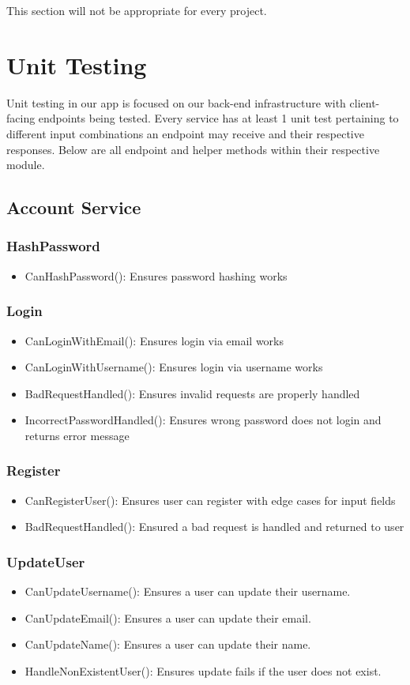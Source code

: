 \documentclass[12pt, titlepage]{article}
\begin{document}
This section will not be appropriate for every project.

\section{Unit Testing}

Unit testing in our app is focused on our back-end infrastructure with client-facing endpoints being tested. Every service has at least 1 unit test pertaining to different input combinations an endpoint may receive and their respective responses. Below are all endpoint and helper methods within their respective module.

\subsection{Account Service}
\subsubsection{HashPassword}
\begin{itemize}
     \item CanHashPassword(): Ensures password hashing works
\end{itemize}
\subsubsection{Login}
\begin{itemize}
    \item CanLoginWithEmail(): Ensures login via email works
    \item CanLoginWithUsername(): Ensures login via username works
    \item BadRequestHandled(): Ensures invalid requests are properly handled
    \item IncorrectPasswordHandled(): Ensures wrong password does not login and returns error message
\end{itemize}
\subsubsection{Register}
\begin{itemize}
    \item CanRegisterUser(): Ensures user can register with edge cases for input fields
    \item BadRequestHandled(): Ensured a bad request is handled and returned to user
\end{itemize}
\subsubsection{UpdateUser}
\begin{itemize}
    \item CanUpdateUsername(): Ensures a user can update their username.
    \item CanUpdateEmail(): Ensures a user can update their email.
    \item CanUpdateName(): Ensures a user can update their name.
    \item HandleNonExistentUser(): Ensures update fails if the user does not exist.
\end{itemize}
\end{document}
